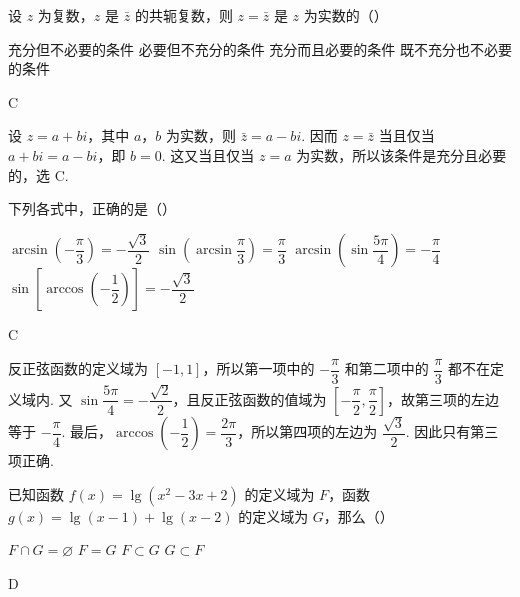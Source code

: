 \begin{problem}

设 \(z\) 为复数，\(z\) 是 \(\bar{z}\) 的共轭复数，则 \(z=\bar{z}\) 是 \(z\) 为实数的（\quad）

\choices
    {充分但不必要的条件}
    {必要但不充分的条件}
    {充分而且必要的条件}
    {既不充分也不必要的条件}

\begin{answer}
C
\end{answer}
\end{problem}

\begin{solution}
设 \(z=a+bi\)，其中 \(a\)，\(b\) 为实数，则 \(\bar{z}=a-bi\). 因而 \(z=\bar{z}\) 当且仅当 \(a+bi=a-bi\)，即 \(b=0\). 这又当且仅当 \(z=a\) 为实数，所以该条件是充分且必要的，选 C.
\end{solution}

\begin{problem}

下列各式中，正确的是（\quad）

\choices
    {\(\arcsin\left(-\dfrac{\pi}{3}\right)=-\dfrac{\sqrt{3}}{2}\)}
    {\(\sin\left(\arcsin\dfrac{\pi}{3}\right)=\dfrac{\pi}{3}\)}
    {\(\arcsin\left(\sin\dfrac{5\pi}{4}\right)=-\dfrac{\pi}{4}\)}
    {\(\sin\left[\arccos\left(-\dfrac{1}{2}\right)\right]=-\dfrac{\sqrt{3}}{2}\)}

\begin{answer}
C
\end{answer}
\end{problem}

\begin{solution}
反正弦函数的定义域为 \([-1,1]\)，所以第一项中的 \(-\dfrac{\pi}{3}\) 和第二项中的 \(\dfrac{\pi}{3}\) 都不在定义域内. 又 \(\sin\dfrac{5\pi}{4}=-\dfrac{\sqrt{2}}{2}\)，且反正弦函数的值域为 \(\left[-\dfrac{\pi}{2},\dfrac{\pi}{2}\right]\)，故第三项的左边等于 \(-\dfrac{\pi}{4}\). 最后，\(\arccos\left(-\dfrac{1}{2}\right)=\dfrac{2\pi}{3}\)，所以第四项的左边为 \(\dfrac{\sqrt{3}}{2}\). 因此只有第三项正确.
\end{solution}

\begin{problem}

已知函数 \(f(x)=\lg\left(x^2-3x+2\right)\) 的定义域为 \(F\)，函数 \(g(x)=\lg(x-1)+\lg(x-2)\) 的定义域为 \(G\)，那么（\quad）

\choices
    {\(F\cap G=\varnothing\)}
    {\(F=G\)}
    {\(F\subset G\)}
    {\(G\subset F\)}

\begin{answer}
D
\end{answer}
\end{problem}


